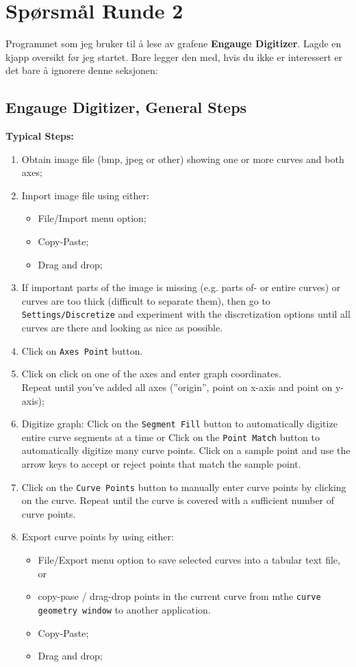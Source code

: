 \section{Spørsmål Runde 2 }
Programmet som jeg bruker til å lese av grafene \textbf{Engauge Digitizer}.  
Lagde en kjapp oversikt før jeg startet. Bare legger den med, hvis du ikke er interessert er det bare å ignorere 
denne seksjonen:
\subsection{Engauge Digitizer, General Steps}
\textbf{Typical Steps:}
\begin{enumerate}
   \item Obtain image file (bmp, jpeg or other) showing one or more curves and both axes;
   \item Import image file using either:
      \begin{itemize}
         \item File/Import menu option;
         \item Copy-Paste;
         \item Drag and drop;
      \end{itemize}
   \item If important parts of the image is missing (e.g. parts of- or entire curves) or 
      curves are too thick (difficult to separate them),
      then go to \texttt{Settings/Discretize} and experiment with the discretization options
      until all curves are there and looking as nice as possible.
   \item Click on \texttt{Axes Point} button. 
   \item Click on click on one of the axes and enter graph coordinates.\\
         Repeat until you've added all axes (''origin'', point on x-axis and point on y-axis);
   \item Digitize graph: Click on the \texttt{Segment Fill} button to automatically digitize entire curve
         segments at a time or Click on the \texttt{Point Match} button to automatically digitize many 
         curve points. Click on a sample point and use the arrow keys to accept or reject points that match
      the sample point.


   \item Click on the \texttt{Curve Points} button to manually enter curve points by 
      clicking on the curve. Repeat until the curve is covered with a sufficient number of curve points.
   \item Export curve points by using either: 
      \begin{itemize}
         \item File/Export menu option to save selected curves into a tabular text file, or
         \item copy-pase / drag-drop points in the current curve from mthe \texttt{curve geometry window}
               to another application.
         \item Copy-Paste;
         \item Drag and drop;
      \end{itemize}
\end{enumerate}
